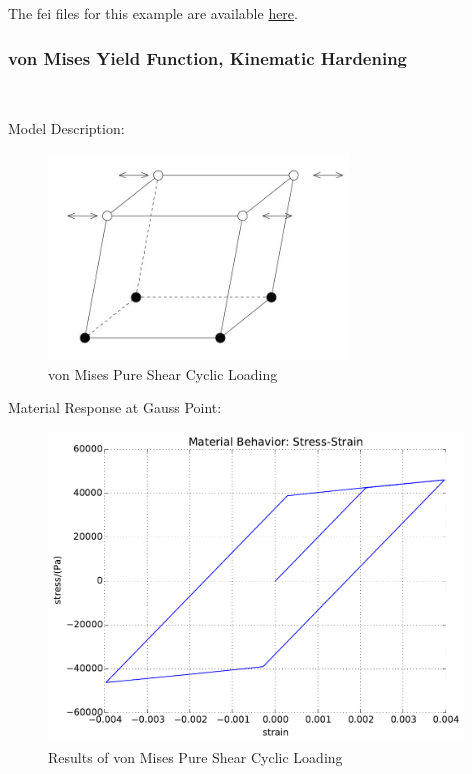 \documentclass[fleqn,11pt]{article}
\begin{document}
The fei files for this example are available \href{https://github.com/yuan-energy/education_examples/tree/master/fei_examples/isotropic_hardening_pure_shear/2pure_shear_cyclic_loading}{here}.


\newpage
\subsubsection{von Mises Yield Function, Kinematic Hardening} ~

Model Description:

\begin{figure}[H]
\begin{center}
\includegraphics[width=8cm]{../Figure-files/shear_cyclic_brick.JPG}
\caption{
\label{von Mises Pure Shear Cyclic Loadin}
von Mises Pure Shear Cyclic Loading}
\end{center}
\end{figure}

Material Response at Gauss Point:

\begin{figure}[H]
\begin{center}
\includegraphics[width=11cm]{../fei_examples/kinematic_hardening_pure_shear_solid/2pure_shear_cyclic_loading/result.pdf}
\caption{
\label{Results of von Mises Pure Shear Cyclic Loadin}
Results of von Mises Pure Shear Cyclic Loading}
\end{center}
\end{figure}
\end{document}
